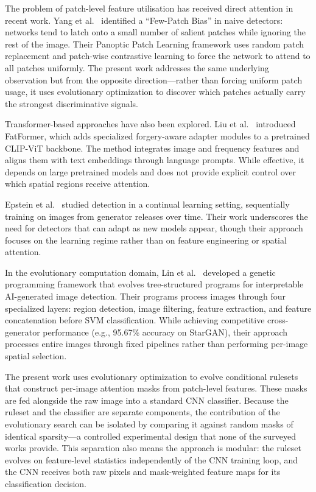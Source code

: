 \documentclass[runningheads]{llncs}
\begin{document}
The problem of patch-level feature utilisation has received direct attention in recent work. Yang et al.~\cite{yang2025panoptic} identified a ``Few-Patch Bias'' in naive detectors: networks tend to latch onto a small number of salient patches while ignoring the rest of the image. Their Panoptic Patch Learning framework uses random patch replacement and patch-wise contrastive learning to force the network to attend to all patches uniformly. The present work addresses the same underlying observation but from the opposite direction---rather than forcing uniform patch usage, it uses evolutionary optimization to discover which patches actually carry the strongest discriminative signals.

Transformer-based approaches have also been explored. Liu et al.~\cite{liu2024fatformer} introduced FatFormer, which adds specialized forgery-aware adapter modules to a pretrained CLIP-ViT backbone. The method integrates image and frequency features and aligns them with text embeddings through language prompts. While effective, it depends on large pretrained models and does not provide explicit control over which spatial regions receive attention.

Epstein et al.~\cite{epstein2023online} studied detection in a continual learning setting, sequentially training on images from generator releases over time. Their work underscores the need for detectors that can adapt as new models appear, though their approach focuses on the learning regime rather than on feature engineering or spatial attention.

In the evolutionary computation domain, Lin et al.~\cite{lin2023genetic} developed a genetic programming framework that evolves tree-structured programs for interpretable AI-generated image detection. Their programs process images through four specialized layers: region detection, image filtering, feature extraction, and feature concatenation before SVM classification. While achieving competitive cross-generator performance (e.g., 95.67\% accuracy on StarGAN), their approach processes entire images through fixed pipelines rather than performing per-image spatial selection.

The present work uses evolutionary optimization to evolve conditional rulesets that construct per-image attention masks from patch-level features. These masks are fed alongside the raw image into a standard CNN classifier. Because the ruleset and the classifier are separate components, the contribution of the evolutionary search can be isolated by comparing it against random masks of identical sparsity---a controlled experimental design that none of the surveyed works provide. This separation also means the approach is modular: the ruleset evolves on feature-level statistics independently of the CNN training loop, and the CNN receives both raw pixels and mask-weighted feature maps for its classification decision.
\end{document}
